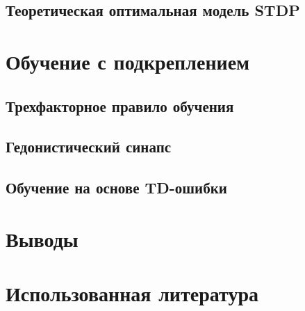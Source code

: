 \documentclass[a4paper,10pt]{article}
\begin{document}
\subsection{Теоретическая оптимальная модель STDP}
\section{Обучение с подкреплением}
\subsection{Трехфакторное правило обучения}
\subsection{Гедонистический синапс}
\subsection{Обучение на основе TD-ошибки}
\section{Выводы}
\section{Использованная литература}
{}

\end{document}
